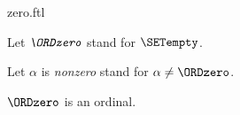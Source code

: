 \documentclass{naproche-library}
\begin{document}
\begin{smodule}[title=The number $0$]{zero.ftl}

\begin{convention}[forthel]
  Let $\emph{\ORDzero}$ stand for $\SETempty$.

  Let $\alpha$ is \emph{nonzero} stand for $\alpha \neq \ORDzero$.
\end{convention}

\begin{proposition}[forthel,id=SET_THEORY_02_8483196888940544]
  $\ORDzero$ is an ordinal.
\end{proposition}
\end{smodule}
\end{document}
